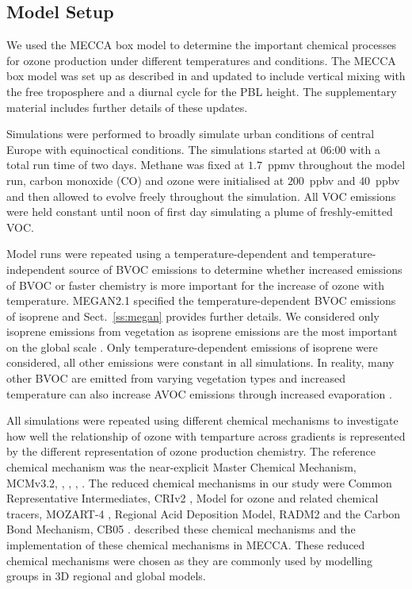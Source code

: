 \subsection{Model Setup} \label{ss:model_setup}
We used the MECCA box model to determine the important chemical processes for ozone production under different temperatures and  conditions.
The MECCA box model was set up as described in \citet{Coates:2015} and updated to include vertical mixing with the free troposphere and a diurnal cycle for the PBL height.
The supplementary material includes further details of these updates.

Simulations were performed to broadly simulate urban conditions of central Europe with equinoctical conditions.
The simulations started at 06:00 with a total run time of two days.
Methane was fixed at $1.7$~ppmv throughout the model run, carbon monoxide (CO) and ozone were initialised at $200$~ppbv and $40$~ppbv and then allowed to evolve freely throughout the simulation.
All VOC emissions were held constant until noon of first day simulating a plume of freshly-emitted VOC.

Model runs were repeated using a temperature-dependent and temperature-independent source of BVOC emissions to determine whether increased emissions of BVOC or faster chemistry is more important for the increase of ozone with temperature. 
MEGAN2.1 \citep{Guenther:2012} specified the temperature-dependent BVOC emissions of isoprene and Sect.~\ref{ss:megan} provides further details. 
We considered only isoprene emissions from vegetation as isoprene emissions are the most important on the global scale \citep{Guenther:2006}. 
Only temperature-dependent emissions of isoprene were considered, all other emissions were constant in all simulations.
In reality, many other BVOC are emitted from varying vegetation types \citep{Guenther:2006} and increased temperature can also increase AVOC emissions through increased evaporation \citep{Rubin:2006}.

All simulations were repeated using different chemical mechanisms to investigate how well the relationship of ozone with temparture across  gradients is represented by the different representation of ozone production chemistry.
The reference chemical mechanism was the near-explicit Master Chemical Mechanism, MCMv3.2, \citep{Jenkin:1997}, \citep{Jenkin:2003}, \citep{Saunders:2003}, \citep{MCM_Site}.
The reduced chemical mechanisms in our study were Common Representative Intermediates, CRIv2 \citep{Jenkin:2008}, Model for ozone and related chemical tracers, MOZART-4 \citep{Emmons:2010}, Regional Acid Deposition Model, RADM2 \citep{Stockwell:1990} and the Carbon Bond Mechanism, CB05 \citep{Yarwood:2005}. 
\citet{Coates:2015} described these chemical mechanisms and the implementation of these chemical mechanisms in MECCA.
These reduced chemical mechanisms were chosen as they are commonly used by modelling groups in 3D regional and global models.

